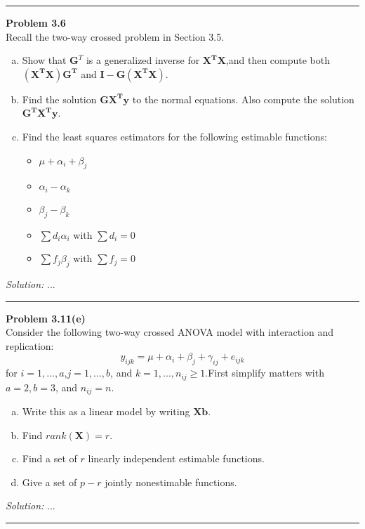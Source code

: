 \documentclass[a4paper, 11pt]{article}
\newenvironment{problem}[2][Problem]
    { \begin{mdframed}[backgroundcolor=gray!20] \textbf{#1 #2} \\}
    {  \end{mdframed}}
\newenvironment{solution}
    {\textit{Solution:}}
    {}
\begin{document}
\noindent\rule{7in}{2.8pt}
\begin{problem}{3.6}
  Recall the two-way crossed problem in Section 3.5. 
  \begin{enumerate}[a.]
    \item Show that $\mathbf{G}^T$ is a generalized inverse for $\mathbf{X^TX}$,and then compute both $\mathbf{\left(X^TX\right)G^T}$ and $\mathbf{I-G\left(X^TX\right)}$.
    \item Find the solution $\mathbf{GX^Ty}$ to the normal equations. Also compute the solution $\mathbf{G^TX^Ty}$.
    \item Find the least squares estimators for the following estimable functions:
    \begin{itemize}
      \item $\mu+\alpha_{i}+\beta_{j}$
      \item $\alpha_{i}-\alpha_{k}$
      \item $\beta_{j}-\beta_{k}$
      \item $\sum d_{i} \alpha_{i}$ with $\sum d_{i}=0$
      \item $\sum f_{j} \beta_{j}$ with $\sum f_{j}=0$
    \end{itemize} 
  \end{enumerate}
\end{problem}
\begin{solution}
...
\end{solution}

\noindent\rule{7in}{2.8pt}
\begin{problem}{3.11(e)}
  Consider the following two-way crossed ANOVA model with interaction and replication:
  $$
  y_{ijk}=\mu+\alpha_{i}+\beta_{j}+\gamma_{ij}+e_{ijk}
  $$
  for $i = 1,...,a$,$j = 1,...,b$, and $k = 1,...,n_{ij} \geq 1$.First simplify matters with $a = 2, b = 3$, and $n_{ij} = n$.
  \begin{enumerate}[a.]
    \item Write this as a linear model by writing $\mathbf{Xb}$.
    \item Find $rank(\mathbf{X}) = r$.
    \item Find a set of $r$ linearly independent estimable functions.
    \item Give a set of $p - r$ jointly nonestimable functions.
  \end{enumerate}
\end{problem}
\begin{solution}
...
\end{solution}
\noindent\rule{7in}{2.8pt}
\end{document}
